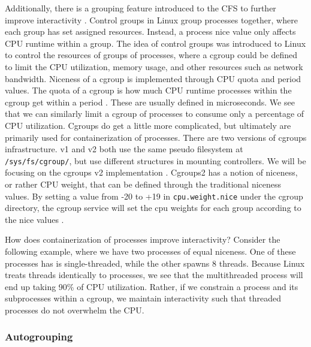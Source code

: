\documentclass[12pt]{article}
\begin{document}
Additionally, there is a grouping feature introduced to the CFS to further improve interactivity \cite{heoControlGroupV22015,ControlGroupsLinux}. Control groups in Linux group processes together, where each group has set assigned resources. Instead, a process nice value only affects CPU runtime within a group. The idea of control groups was introduced to Linux to control the resources of groups of processes, where a cgroup could be defined to limit the CPU utilization, memory usage, and other resources such as network bandwidth. Niceness of a cgroup is implemented through CPU quota and period values. The quota of a cgroup is how much CPU runtime processes within the cgroup get within a period \cite{seltzerUnderstandingCgroups2018}. These are usually defined in microseconds. We see that we can similarly limit a cgroup of processes to consume only a percentage of CPU utilization. Cgroups do get a little more complicated, but ultimately are primarily used for containerization of processes. There are two versions of cgroups infrastructure. v1 and v2 both use the same pseudo filesystem at \texttt{/sys/fs/cgroup/}, but use different structures in mounting controllers. We will be focusing on the cgroups v2 implementation \cite{heoControlGroupV22015}. Cgroups2 has a notion of niceness, or rather CPU weight, that can be defined through the traditional niceness values. By setting a value from -20 to +19 in \texttt{cpu.weight.nice} under the cgroup directory, the cgroup service will set the cpu weights for each group according to the nice values \cite{CPUControllerCgroup2}.

How does containerization of processes improve interactivity? Consider the following example, where we have two processes of equal niceness. One of these processes has is single-threaded, while the other spawns 8 threads. Because Linux treats threads identically to processes, we see that the multithreaded process will end up taking 90\% of CPU utilization. Rather, if we constrain a process and its subprocesses within a cgroup, we maintain interactivity such that threaded processes do not overwhelm the CPU.

\subsubsection*{Autogrouping}
\end{document}
